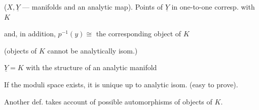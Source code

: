 ($X,\underline Y$ — manifolds and an analytic map). Points of $\underline Y$ in one-to-one corresp. with $K$ 



and, in addition, $p^{-1}(y)\cong$ the corresponding object of $K$



(objects of $K$ cannot be analytically isom.)








$\underline Y=K$ with the structure of an analytic manifold



If the moduli space exists, it is unique up to analytic isom. (easy to prove).



Another def. takes account of possible automorphisms of objects of $K$.



